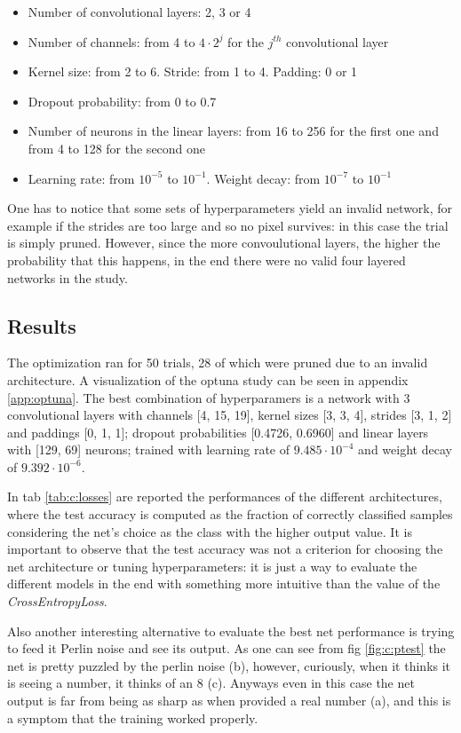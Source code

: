 \documentclass[a4paper, 11pt]{article}
\begin{document}
    \begin{itemize}
      \item Number of convolutional layers: 2, 3 or 4
      \item Number of channels: from 4 to $4\cdot2^j$ for the $j^{th}$ convolutional layer
      \item Kernel size: from 2 to 6. Stride: from 1 to 4. Padding: 0 or 1
      \item Dropout probability: from 0 to 0.7
      \item Number of neurons in the linear layers: from 16 to 256 for the first one and from 4 to 128 for the second one
      \item Learning rate: from $10^{-5}$ to $10^{-1}$. Weight decay: from $10^{-7}$ to $10^{-1}$
    \end{itemize}
    One has to notice that some sets of hyperparameters yield an invalid network, for example if the strides are too large and so no pixel survives: in this case the trial is simply pruned. However, since the more convoulutional layers, the higher the probability that this happens, in the end there were no valid four layered networks in the study.

  \subsection{Results}
    The optimization ran for 50 trials, 28 of which were pruned due to an invalid architecture. A visualization of the optuna study can be seen in appendix \ref{app:optuna}. The best combination of hyperparamers is a network with 3 convolutional layers with channels [4, 15, 19], kernel sizes [3, 3, 4], strides [3, 1, 2] and paddings [0, 1, 1]; dropout probabilities [0.4726, 0.6960] and linear layers with [129, 69] neurons; trained with learning rate of $9.485\cdot10^{-4}$ and weight decay of $9.392\cdot10^{-6}$.

    In tab \ref{tab:c:losses} are reported the performances of the different architectures, where the test accuracy is computed as the fraction of correctly classified samples considering the net's choice as the class with the higher output value. It is important to observe that the test accuracy was not a criterion for choosing the net architecture or tuning hyperparameters: it is just a way to evaluate the different models in the end with something more intuitive than the value of the \emph{CrossEntropyLoss}.

    Also another interesting alternative to evaluate the best net performance is trying to feed it Perlin noise and see its output. As one can see from fig \ref{fig:c:ptest} the net is pretty puzzled by the perlin noise (b), however, curiously, when it thinks it is seeing a number, it thinks of an 8 (c). Anyways even in this case the net output is far from being as sharp as when provided a real number (a), and this is a symptom that the training worked properly.
\end{document}
